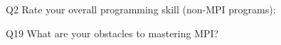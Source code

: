 \begin{description}%
\item{Q2} Rate your overall programming skill (non-MPI programs):%
\item{Q19} What are your obstacles to mastering MPI?%
\end{description}%
